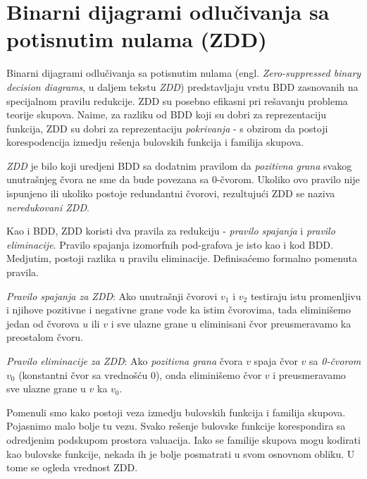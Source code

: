 \section{Binarni dijagrami odlu\v{c}ivanja sa potisnutim nulama (ZDD)}
\label{sec:ZDD}

Binarni dijagrami odlu\v{c}ivanja sa potisnutim nulama (engl. \emph{Zero-suppressed binary decision diagrams}, u daljem tekstu \emph{ZDD}) \cite{ZDD} predstavljaju vrstu BDD zasnovanih na specijalnom pravilu redukcije. ZDD su posebno efikasni pri re\v{s}avanju problema teorije skupova. Naime, za razliku od BDD koji su dobri za reprezentaciju funkcija, ZDD su dobri za reprezentaciju \emph{pokrivanja} - s obzirom da postoji korespodencija izmedju re\v{s}enja bulovskih funkcija i familija skupova.

\begin{defn}
    \emph{ZDD} je bilo koji uredjeni BDD sa dodatnim pravilom da \emph{pozitivna grana} svakog unutra\v{s}njeg \v{c}vora ne sme da bude povezana sa 0-\v{c}vorom. Ukoliko ovo pravilo nije ispunjeno ili ukoliko postoje redundantni \v{c}vorovi, rezultuju\'c{}i ZDD se naziva \emph{neredukovani ZDD}.
\end{defn}

Kao i BDD, ZDD koristi dva pravila za redukciju - \emph{pravilo spajanja} i \emph{pravilo eliminacije}. Pravilo spajanja izomorfnih pod-grafova je isto kao i kod BDD. Medjutim, postoji razlika u pravilu eliminacije. Definisa\'c{}emo formalno pomenuta pravila.

\begin{defn}
    \emph{Pravilo spajanja za ZDD}: Ako unutra\v{s}nji \v{c}vorovi $v_{1}$ i $v_{2}$ testiraju istu promenljivu i njihove pozitivne i negativne grane vode ka istim \v{c}vorovima, tada elimini\v{s}emo jedan od \v{c}vorova $u$ ili $v$ i sve ulazne grane u eliminisani \v{c}vor preusmeravamo ka preostalom \v{c}voru.
\end{defn}

\begin{defn}
    \emph{Pravilo eliminacije za ZDD}: Ako \emph{pozitivna grana} \v{c}vora $v$ spaja \v{c}vor $v$ sa \emph{0-\v{c}vorom} $v_{0}$ (konstantni \v{c}vor sa vredno\v{s}\'c{}u $0$), onda elimini\v{s}emo \v{c}vor $v$ i preusmeravamo sve ulazne grane u $v$ ka $v_{0}$.
\end{defn}

Pomenuli smo kako postoji veza izmedju bulovskih funkcija i familija skupova. Pojasnimo malo bolje tu vezu. Svako re\v{s}enje bulovske funkcije korespondira sa odredjenim podskupom prostora valuacija. Iako se familije skupova mogu kodirati kao bulovske funkcije, nekada ih je bolje posmatrati u svom osnovnom obliku. U tome se ogleda vrednost ZDD.
